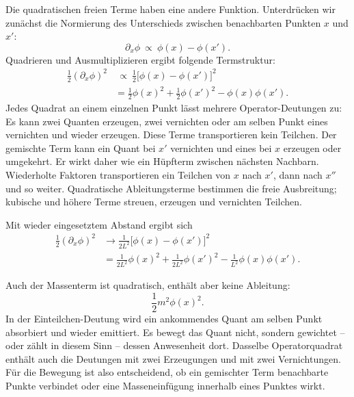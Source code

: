 Die quadratischen freien Terme haben eine andere Funktion. Unterdrücken wir zunächst die Normierung des Unterschieds zwischen benachbarten Punkten \(x\) und \(x'\):
\begin{equation}
\partial_x\phi
\ \propto\
\phi(x)-\phi(x').
\end{equation}
Quadrieren und Ausmultiplizieren ergibt folgende Termstruktur:
\begin{align}
\frac12(\partial_x\phi)^2
&\ \propto\
\frac12\bigl[\phi(x)-\phi(x')\bigr]^2
\\
&=
\frac12\phi(x)^2
+\frac12\phi(x')^2
-\phi(x)\phi(x').
\end{align}
Jedes Quadrat an einem einzelnen Punkt lässt mehrere Operator-Deutungen zu: Es kann zwei Quanten erzeugen, zwei vernichten oder am selben Punkt eines vernichten und wieder erzeugen. Diese Terme transportieren kein Teilchen. Der gemischte Term kann ein Quant bei \(x'\) vernichten und eines bei \(x\) erzeugen oder umgekehrt. Er wirkt daher wie ein Hüpfterm zwischen nächsten Nachbarn. Wiederholte Faktoren transportieren ein Teilchen von \(x\) nach \(x'\), dann nach \(x''\) und so weiter. Quadratische Ableitungsterme bestimmen die freie Ausbreitung; kubische und höhere Terme streuen, erzeugen und vernichten Teilchen.

\begin{classroomqa}
\end{classroomqa}

Mit wieder eingesetztem Abstand ergibt sich
\begin{align}
\frac12(\partial_x\phi)^2
&\longrightarrow
\frac{1}{2L^2}\bigl[\phi(x)-\phi(x')\bigr]^2
\\
&=
\frac{1}{2L^2}\phi(x)^2
+\frac{1}{2L^2}\phi(x')^2
-\frac{1}{L^2}\phi(x)\phi(x').
\end{align}

Auch der Massenterm ist quadratisch, enthält aber keine Ableitung:
\begin{equation}
\frac12m^2\phi(x)^2.
\end{equation}
In der Einteilchen-Deutung wird ein ankommendes Quant am selben Punkt absorbiert und wieder emittiert. Es bewegt das Quant nicht, sondern gewichtet – oder zählt in diesem Sinn – dessen Anwesenheit dort. Dasselbe Operatorquadrat enthält auch die Deutungen mit zwei Erzeugungen und mit zwei Vernichtungen. Für die Bewegung ist also entscheidend, ob ein gemischter Term benachbarte Punkte verbindet oder eine Masseneinfügung innerhalb eines Punktes wirkt.

